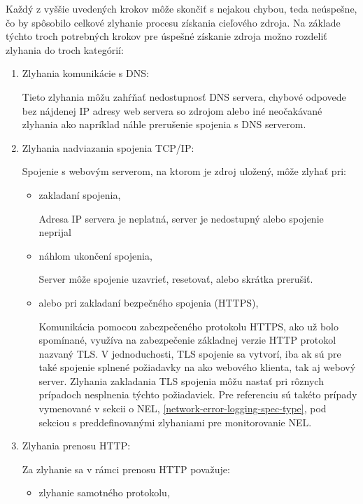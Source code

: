 Každý z vyššie uvedených krokov môže skončiť s nejakou chybou, teda neúspešne, čo by spôsobilo celkové zlyhanie procesu získania cieľového zdroja.
Na základe týchto troch potrebných krokov pre úspešné získanie zdroja možno rozdeliť zlyhania do troch kategórií:
\begin{enumerate}
    \item Zlyhania komunikácie s DNS:

    Tieto zlyhania môžu zahŕňať nedostupnosť DNS servera, chybové odpovede bez nájdenej 
    IP adresy web servera so zdrojom alebo iné neočakávané zlyhania ako napríklad náhle prerušenie spojenia s DNS serverom.
    
    \item Zlyhania nadviazania spojenia TCP/IP:

    Spojenie s webovým serverom, na ktorom je zdroj uložený, môže zlyhať pri:
    \begin{itemize}
        \item zakladaní spojenia,
        
        Adresa IP servera je neplatná, server je nedostupný alebo spojenie neprijal
        
        \item náhlom ukončení spojenia,

        Server môže spojenie uzavrieť, resetovať, alebo skrátka prerušiť.  

        \item alebo pri zakladaní bezpečného spojenia (HTTPS),

        Komunikácia pomocou zabezpečeného protokolu HTTPS, ako už bolo spomínané, využíva na zabezpečenie základnej verzie HTTP protokol nazvaný TLS.
        V jednoduchosti, TLS spojenie sa vytvorí, iba ak sú pre také spojenie splnené požiadavky na ako webového klienta, tak aj webový server. 
        Zlyhania zakladania TLS spojenia môžu nastať pri rôznych prípadoch nesplnenia týchto požiadaviek. 
        Pre referenciu sú takéto prípady vymenované v sekcii o NEL, \ref{network-error-logging-spec-type}, 
        pod sekciou s preddefinovanými zlyhaniami pre monitorovanie NEL.
        
    \end{itemize}
    
    \item Zlyhania prenosu HTTP:

    Za zlyhanie sa v rámci prenosu HTTP považuje:
    \begin{itemize}
        \item zlyhanie samotného protokolu,


\end{itemize}
\end{enumerate}
